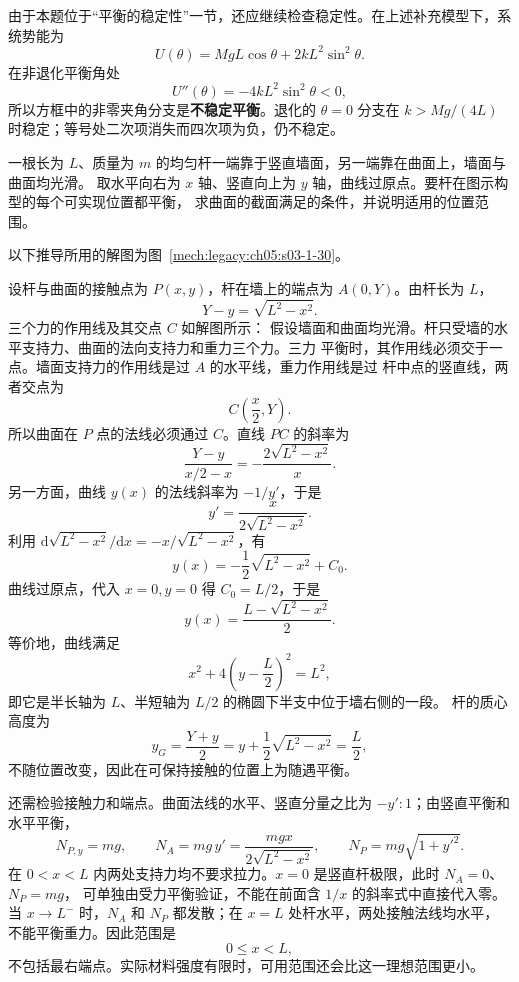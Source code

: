 {\begin{xesolution}
由于本题位于“平衡的稳定性”一节，还应继续检查稳定性。在上述补充模型下，系统势能为
\[
  U(\theta)=MgL\cos\theta+2kL^2\sin^2\theta.
\]
在非退化平衡角处
\[
  U''(\theta)=-4kL^2\sin^2\theta<0,
\]
所以方框中的非零夹角分支是\textbf{不稳定平衡}。退化的 $\theta=0$ 分支在
$k>Mg/(4L)$ 时稳定；等号处二次项消失而四次项为负，仍不稳定。
\end{xesolution}

\begin{origexamplebox}{}\label{ch05:ex:s03-1-30}
一根长为 $L$、质量为 $m$ 的均匀杆一端靠于竖直墙面，另一端靠在曲面上，墙面与曲面均光滑。
取水平向右为 $x$ 轴、竖直向上为 $y$ 轴，曲线过原点。要杆在图示构型的每个可实现位置都平衡，
求曲面的截面满足的条件，并说明适用的位置范围。
\end{origexamplebox}

\begin{xesolution}
以下推导所用的解图为图~\ref{mech:legacy:ch05:s03-1-30}。

设杆与曲面的接触点为 $P(x,y)$，杆在墙上的端点为 $A(0,Y)$。由杆长为 $L$，
\[
  Y-y=\sqrt{L^2-x^2}.
\]
三个力的作用线及其交点 $C$ 如解图所示：
\soldiagOneThirty
假设墙面和曲面均光滑。杆只受墙的水平支持力、曲面的法向支持力和重力三个力。三力
平衡时，其作用线必须交于一点。墙面支持力的作用线是过 $A$ 的水平线，重力作用线是过
杆中点的竖直线，两者交点为
\[
  C\left(\frac x2,Y\right).
\]
所以曲面在 $P$ 点的法线必须通过 $C$。直线 $PC$ 的斜率为
\[
  \frac{Y-y}{x/2-x}=-\frac{2\sqrt{L^2-x^2}}{x}.
\]
另一方面，曲线 $y(x)$ 的法线斜率为 $-1/y'$，于是
\[
  y'=\frac{x}{2\sqrt{L^2-x^2}}.
\]
利用 $\mathrm d\sqrt{L^2-x^2}/\mathrm dx=-x/\sqrt{L^2-x^2}$，有
\[
 y(x)=-\frac12\sqrt{L^2-x^2}+C_0.
\]
曲线过原点，代入 $x=0,y=0$ 得 $C_0=L/2$，于是
\[
  \boxed{y(x)=\frac{L-\sqrt{L^2-x^2}}{2}}.
\]
等价地，曲线满足
\[
  \boxed{x^2+4\left(y-\frac L2\right)^2=L^2},
\]
即它是半长轴为 $L$、半短轴为 $L/2$ 的椭圆下半支中位于墙右侧的一段。
杆的质心高度为
\[
 y_G=\frac{Y+y}{2}=y+\frac12\sqrt{L^2-x^2}=\frac L2,
\]
不随位置改变，因此在可保持接触的位置上为随遇平衡。

还需检验接触力和端点。曲面法线的水平、竖直分量之比为 $-y':1$；由竖直平衡和水平平衡，
\[
 N_{P,y}=mg,\qquad
 N_A=mg\,y'=\frac{mgx}{2\sqrt{L^2-x^2}},\qquad
 N_P=mg\sqrt{1+y'^2}.
\]
在 $0<x<L$ 内两处支持力均不要求拉力。$x=0$ 是竖直杆极限，此时 $N_A=0$、$N_P=mg$，
可单独由受力平衡验证，不能在前面含 $1/x$ 的斜率式中直接代入零。
当 $x\to L^-$ 时，$N_A$ 和 $N_P$ 都发散；在 $x=L$ 处杆水平，两处接触法线均水平，
不能平衡重力。因此范围是
\[
 \boxed{0\le x<L},
\]
不包括最右端点。实际材料强度有限时，可用范围还会比这一理想范围更小。
\end{xesolution}

}
